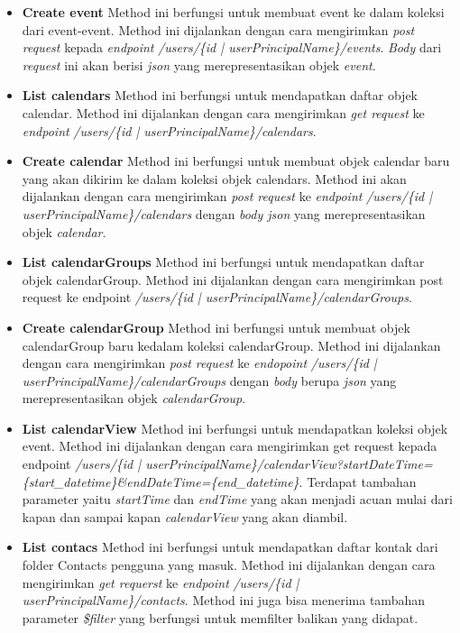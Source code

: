 \begin{itemize}
	\item \textbf{Create event}
	Method ini berfungsi untuk membuat event ke dalam koleksi dari event-event. Method ini dijalankan dengan cara mengirimkan \textit{post request} kepada \textit{endpoint} \textit{/users/\{id | userPrincipalName\}/events}. \textit{Body} dari \textit{request} ini akan berisi \textit{json} yang merepresentasikan objek \textit{event}.
	\item \textbf{List calendars}
	Method ini berfungsi untuk mendapatkan daftar objek calendar. Method ini dijalankan dengan cara mengirimkan \textit{get request} ke \textit{endpoint} \textit{/users/\{id | userPrincipalName\}/calendars}. 
	\item \textbf{Create calendar}
	Method ini berfungsi untuk membuat objek calendar baru yang akan dikirim ke dalam koleksi objek calendars. Method ini akan dijalankan dengan cara mengirimkan \textit{post request} ke \textit{endpoint} \textit{/users/\{id | userPrincipalName\}/calendars} dengan \textit{body json} yang merepresentasikan objek \textit{calendar}.
	\item \textbf{List calendarGroups}
	Method ini berfungsi untuk mendapatkan daftar objek calendarGroup. Method ini dijalankan dengan cara mengirimkan post request ke endpoint \textit{/users/\{id | userPrincipalName\}/calendarGroups}.                                                                                                                                                                                      
	\item \textbf{Create calendarGroup}
	Method ini berfungsi untuk membuat objek calendarGroup baru kedalam koleksi calendarGroup. Method ini dijalankan dengan cara mengirimkan \textit{post request} ke \textit{endopoint} \textit{/users/\{id | userPrincipalName\}/calendarGroups} dengan \textit{body} berupa \textit{json} yang merepresentasikan objek \textit{calendarGroup}.
	\item \textbf{List calendarView}
	Method ini berfungsi untuk mendapatkan koleksi objek event. Method ini dijalankan dengan cara mengirimkan get request kepada endpoint \textit{/users/\{id | userPrincipalName\}/calendarView?startDateTime=\{start\_datetime\}\&endDateTime=\{end\_datetime\}}. Terdapat tambahan parameter yaitu \textit{startTime} dan \textit{endTime} yang akan menjadi acuan mulai dari kapan dan sampai kapan \textit{calendarView} yang akan diambil. 
	\item \textbf{List contacs}
	Method ini berfungsi untuk mendapatkan daftar kontak dari folder Contacts pengguna yang masuk. Method ini dijalankan dengan cara mengirimkan \textit{get requerst} ke \textit{endpoint} \textit{/users/\{id | userPrincipalName\}/contacts}. Method ini juga bisa menerima tambahan parameter \textit{\$filter} yang berfungsi untuk memfilter balikan yang didapat. 

\end{itemize}
